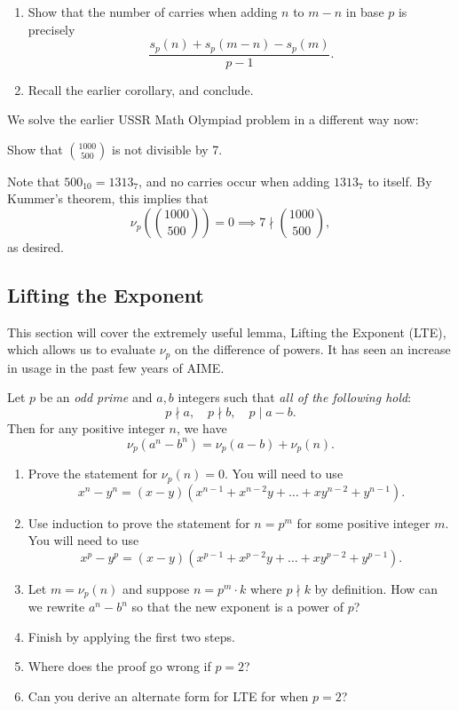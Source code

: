 \documentclass[mast]{lucky}
\begin{document}
\begin{walk}
    \begin{enumerate}
        \item Show that the number of carries when adding $n$ to $m-n$ in base $p$ is precisely \[\frac{s_p(n)+s_p(m-n)-s_p(m)}{p-1}.\]
        \item Recall the earlier corollary, and conclude.
    \end{enumerate}
\end{walk}

We solve the earlier USSR Math Olympiad problem in a different way now:
\begin{exam}
    Show that $\binom{1000}{500}$ is not divisible by 7.
\end{exam}

\begin{sol}
    Note that $500_{10}=1313_7$, and no carries occur when adding $1313_7$ to itself. By Kummer's theorem, this implies that \[\nu_p\left( \binom{1000}{500} \right)=0\implies 7\nmid \binom{1000}{500},\] as desired.
\end{sol}
\subsection{Lifting the Exponent}
This section will cover the extremely useful lemma, Lifting the Exponent (LTE), which allows us to evaluate $\nu_p$ on the difference of powers. It has seen an increase in usage in the past few years of AIME.\\

\begin{theo}[LTE]
    Let $p$ be an \emph{odd prime} and $a,b$ integers such that \emph{all of the following hold}: \[p\nmid a,\quad p\nmid b,\quad p\mid a-b.\] Then for any positive integer $n$, we have \[\nu_p(a^n-b^n)=\nu_p(a-b)+\nu_p(n).\]
\end{theo}

\begin{walk}
    \begin{enumerate}
        \item Prove the statement for $\nu_p(n)=0$. You will need to use \[x^n-y^n=(x-y)\left(x^{n-1}+x^{n-2}y+\dots+xy^{n-2}+y^{n-1}\right).\]
        \item Use induction to prove the statement for $n=p^m$ for some positive integer $m$. You will need to use \[x^p-y^p=(x-y)\left(x^{p-1}+x^{p-2}y+\dots+xy^{p-2}+y^{p-1}\right).\]
        \item Let $m=\nu_p(n)$ and suppose $n=p^m\cdot k$ where $p\nmid k$ by definition. How can we rewrite $a^n-b^n$ so that the new exponent is a power of $p$?
        \item Finish by applying the first two steps.
        \item Where does the proof go wrong if $p=2$?
        \item Can you derive an alternate form for LTE for when $p=2$?
    \end{enumerate}
\end{walk}
\end{document}
